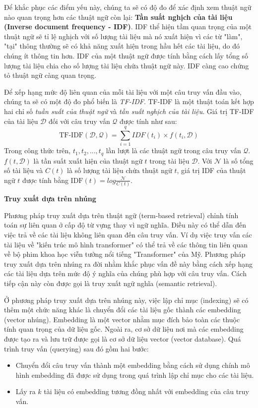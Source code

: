 Để khắc phục các điểm yếu này, chúng ta sẽ có độ đo để xác định xem thuật ngữ nào quan trọng hơn các thuật ngữ còn lại: \textbf{Tần suất nghịch của tài liệu (Inverse document frequency - IDF)}. IDF thể hiện tầm quan trọng của một thuật ngữ sẽ tỉ lệ nghịch với số lượng tài liệu mà nó xuất hiện vì các từ "làm", "tại" thông thường sẽ có khả năng xuất hiện trong hầu hết các tài liệu, do đó chúng ít thông tin hơn. IDF của một thuật ngữ được tính bằng cách lấy tổng số lượng tài liệu chia cho số lượng tài liệu chứa thuật ngữ này. IDF càng cao chứng tỏ thuật ngữ càng quan trọng.

Để xếp hạng mức độ liên quan của mỗi tài liệu với một câu truy vấn đầu vào, chúng ta sẽ có một độ đo phổ biến là \textit{TF-IDF}. TF-IDF là một thuật toán kết hợp hai chỉ số \textit{tuần suất của thuật ngữ} và \textit{tần suất nghịch của tài liệu}. Giá trị TF-IDF của tài liệu $\mathcal{D}$ đối với câu truy vấn $\mathcal{Q}$ được tính như sau:
\begin{equation}
    \text{TF-IDF}(\mathcal{D, Q}) = \sum_{i=1}^{q} IDF(t_i) \times f(t_i, \mathcal{D})
\end{equation}
Trong công thức trên, $t_1, t_2,..., t_q$ lần lượt là các thuật ngữ trong câu truy vấn $\mathcal{Q}$. $f(t, \mathcal{D})$ là tần suất xuất hiện của thuật ngữ $t$ trong tài liệu $\mathcal{D}$. Với $\mathcal{N}$ là số tổng số tài liệu và $C(t)$ là số lượng tài liệu chứa thuật ngữ $t$, giá trị IDF của thuật ngữ $t$ được tính bằng $\text{IDF}(t) = log \frac{\mathcal{N}}{C(t)}$.

\vspace{1em}
\textbf{Truy xuất dựa trên nhúng} 

Phương pháp truy xuất dựa trên thuật ngữ (term-based retrieval) chỉnh tính toán sự liên quan ở cấp độ từ vựng thay vì ngữ nghĩa. Điều này có thể dẫn đến việc trả về các tài liệu không liên quan đến câu truy vấn. Ví dụ việc truy vấn các tài liệu về "kiến trúc mô hình transformer" có thể trả về các thông tin liên quan về bộ phim khoa học viễn tưởng nổi tiếng "Transformer" của Mỹ. Phương pháp truy xuất dựa trên nhúng ra đời nhằm khắc phục vấn đề này bằng cách xếp hạng các tài liệu dựa trên mức độ ý nghĩa của chúng phù hợp với câu truy vấn. Cách tiếp cận này còn được gọi là truy xuất ngữ nghĩa (semantic retrieval).

Ở phương pháp truy xuất dựa trên nhúng này, việc lập chỉ mục (indexing) sẽ có thêm một chức năng khác là chuyển đổi các tài liệu gốc thành các embedding (vector nhúng). Embedding là một vector nhằm mục đích bảo toàn các thuộc tính quan trọng của dữ liệu gốc. Ngoài ra, cơ sở dữ liệu nơi mà các embedding được tạo ra và lưu trữ được gọi là cơ sở dữ liệu vector (vector database). Quá trình truy vấn (querying) sau đó gồm hai bước:
\begin{itemize}
    \item Chuyển đổi câu truy vấn thành một embedding bằng cách sử dụng chính mô hình embedding đã được sử dụng trong quá trình lập chỉ mục cho các tài liệu.
    \item Lấy ra $k$ tài liệu có embedding tương đồng nhất với embedding của câu truy vấn.
\end{itemize}

